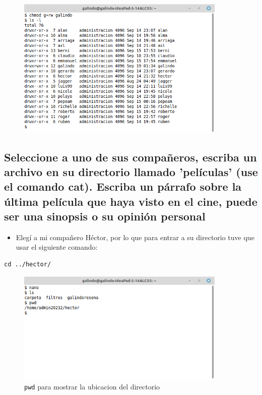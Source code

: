 \documentclass[11pt]{article}
\begin{document}
\begin{figure}[htbp]
\centering
\includegraphics[width=10cm]{img/a18.png}
\caption{}
\end{figure}

\cite{linux_chmod}

\subsection{Seleccione a uno de sus compañeros, escriba un archivo en su directorio llamado 'películas' (use el comando cat). Escriba un párrafo sobre la última película que haya visto en el cine, puede ser una sinopsis o su opinión personal}
\label{sec:orge19f191}
\begin{itemize}
\item Elegí a mi compañero Héctor, por lo que para entrar a su directorio tuve que usar el siguiente comando:
\end{itemize}

\begin{verbatim}
cd ../hector/
\end{verbatim}

\begin{figure}[htbp]
\centering
\includegraphics[width=10cm]{img/pwd.png}
\caption[\texttt{pwd}]{\texttt{pwd} para mostrar la ubicacion del directorio}
\end{figure}
\end{document}
